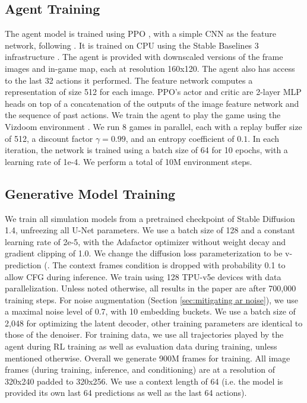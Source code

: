 \documentclass{article} %
\begin{document}
\subsection{Agent Training}
The agent model is trained using PPO \citep{SchulmanWDRK17ppo}, with a simple CNN as the feature network, following \cite{Mnih2015HumanlevelCT}. It is trained on CPU using the Stable Baselines 3 infrastructure \citep{stable-baselines3}.
The agent is provided with downscaled versions of the frame images and in-game map, each at resolution 160x120.
The agent also has access to the last 32 actions it performed.
The feature network computes a representation of size 512 for each image.
PPO's actor and critic are 2-layer MLP heads on top of a concatenation of the outputs of the image feature network and the sequence of past actions.
We train the agent to play the game using the Vizdoom environment \citep{Wydmuch2019ViZdoom}.
We run 8 games in parallel, each with a replay buffer size of 512, a discount factor $\gamma=0.99$, and an entropy coefficient of $0.1$. In each iteration, the network is trained using a batch size of 64 for 10 epochs, with a learning rate of 1e-4.
We perform a total of 10M environment steps.

\subsection{Generative Model Training}
We train all simulation models from a pretrained checkpoint of Stable Diffusion 1.4, unfreezing all U-Net parameters. We use a batch size of 128 and a constant learning rate of 2e-5, with the Adafactor optimizer without weight decay \citep{Shazeer2018adafactor} and gradient clipping of 1.0. We change the diffusion loss parameterization to be v-prediction (\cite{SalimansH22}. The context frames condition is dropped with probability 0.1 to allow CFG during inference. We train using 128 TPU-v5e devices with data parallelization. Unless noted otherwise, all results in the paper are after 700,000 training steps.
For noise augmentation (Section \ref{sec:mitigating ar noise}), we use a maximal noise level of 0.7, with 10 embedding buckets.
We use a batch size of 2,048 for optimizing the latent decoder, other training parameters are identical to those of the denoiser.
For training data, we use all trajectories played by the agent during RL training as well as evaluation data during training, unless mentioned otherwise. Overall we generate 900M frames for training. All image frames (during training, inference, and conditioning) are at a resolution of 320x240 padded to 320x256. We use a context length of 64 (i.e. the model is provided its own last 64 predictions as well as the last 64 actions).
\end{document}
